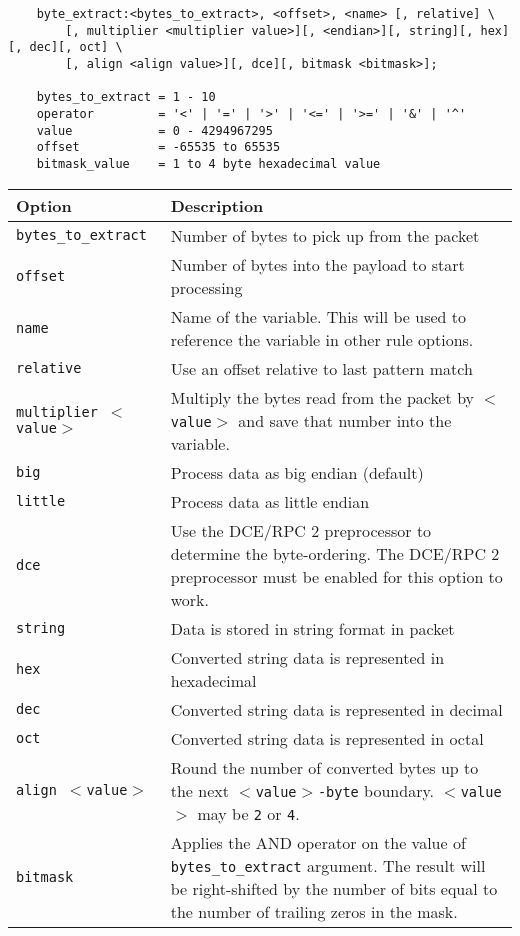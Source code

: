 \documentclass[english]{report}
\begin{document}
\begin{verbatim}
    byte_extract:<bytes_to_extract>, <offset>, <name> [, relative] \
        [, multiplier <multiplier value>][, <endian>][, string][, hex][, dec][, oct] \
        [, align <align value>][, dce][, bitmask <bitmask>];

    bytes_to_extract = 1 - 10
    operator         = '<' | '=' | '>' | '<=' | '>=' | '&' | '^'
    value            = 0 - 4294967295
    offset           = -65535 to 65535
    bitmask_value    = 1 to 4 byte hexadecimal value
\end{verbatim}

\begin{tabular}{| l | p{4.5in} |}
\hline
{\bf Option} & {\bf Description}\\
\hline
\hline
\texttt{bytes\_to\_extract} & Number of bytes to pick up from the packet\\
\hline
\texttt{offset} & Number of bytes into the payload to start processing\\
\hline
\texttt{name} & Name of the variable. This will be used to reference the
variable in other rule options.\\
\hline
\texttt{relative} & Use an offset relative to last pattern match\\
\hline
\texttt{multiplier $<$value$>$} & Multiply the bytes read from the packet by
\texttt{$<$value$>$} and save that number into the variable.\\
\hline
\texttt{big} & Process data as big endian (default)\\
\hline
\texttt{little} & Process data as little endian\\
\hline
\texttt{dce} & Use the DCE/RPC 2 preprocessor to determine the byte-ordering.
The DCE/RPC 2 preprocessor must be enabled for this option to work.\\
\hline
\texttt{string} & Data is stored in string format in packet\\
\hline
\texttt{hex} & Converted string data is represented in hexadecimal\\
\hline
\texttt{dec} & Converted string data is represented in decimal\\
\hline
\texttt{oct} & Converted string data is represented in octal\\
\hline
\texttt{align $<$value$>$} & Round the number of converted bytes up to the next
\texttt{$<$value$>$-byte} boundary. \texttt{$<$value$>$} may be \texttt{2} or
\texttt{4}.\\
\hline
\texttt{bitmask} & Applies the AND operator on the value of \texttt{bytes\_to\_extract} 
argument. The result will be right-shifted by the number of bits equal to the 
number of trailing zeros in the mask.\\
\hline
\end{tabular}
\end{document}

